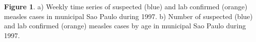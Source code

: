 \textbf{Figure 1}. a) Weekly time series of suspected (blue) and lab
confirmed (orange) measles cases in municipal Sao Paulo during 1997. b)
Number of suspected (blue) and lab confirmed (orange) measles cases by
age in municipal Sao Paulo during 1997.